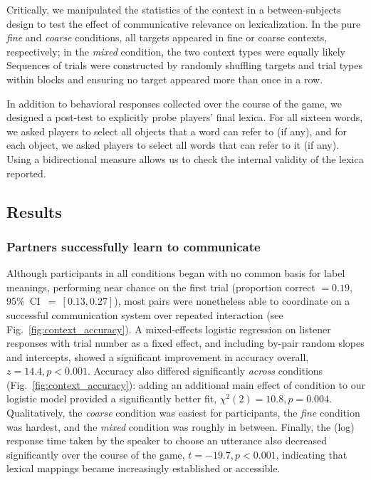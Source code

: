 Critically, we manipulated the statistics of the context in a between-subjects design to test the effect of communicative relevance on lexicalization. In the pure \emph{fine} and \emph{coarse} conditions, all targets appeared in fine or coarse contexts, respectively; in the \emph{mixed} condition, the two context types were equally likely%
Sequences of trials were constructed by randomly shuffling targets and trial types within blocks and ensuring no target appeared more than once in a row. 

In addition to behavioral responses collected over the course of the game, we designed a post-test to explicitly probe players' final lexica. For all sixteen words, we asked players to select all objects that a word can refer to (if any), and for each object, we asked players to select all words that can refer to it (if any). Using a bidirectional measure allows us to check the internal validity of the lexica reported.%

\subsection{Results}

\subsubsection{Partners successfully learn to communicate}

Although participants in all conditions began with no common basis for label meanings, performing near chance on the first trial (proportion correct $= 0.19$, 95\%~CI~$=~[0.13, 0.27]$), most pairs were nonetheless able to coordinate on a successful communication system over repeated interaction (see Fig.\ \ref{fig:context_accuracy}). 
A mixed-effects logistic regression on listener responses with trial number as a fixed effect, and including by-pair random slopes and intercepts, showed a significant improvement in accuracy overall, $z = 14.4, p < 0.001$. 
Accuracy also differed significantly \emph{across} conditions (Fig.\ \ref{fig:context_accuracy}): adding an additional main effect of condition to our logistic model provided a significantly better fit, $\chi^2(2) = 10.8, p = 0.004$. 
Qualitatively, the \emph{coarse} condition was easiest for participants, the \emph{fine} condition was hardest, and the \emph{mixed} condition was roughly in between. %
Finally, the (log) response time taken by the speaker to choose an utterance also decreased significantly over the course of the game, $t = -19.7, p < 0.001$, indicating that lexical mappings became increasingly established or accessible.

